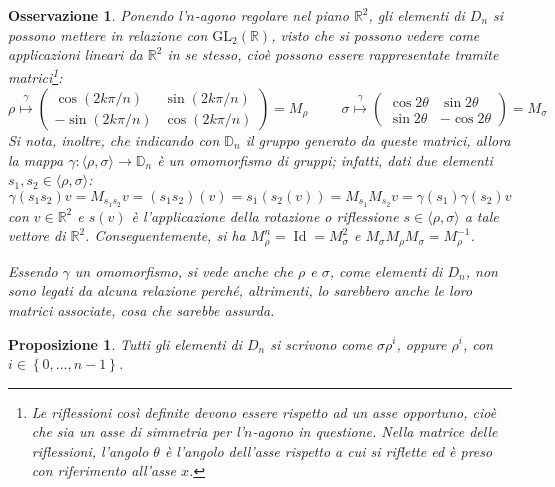 \documentclass[11pt]{article}
\theoremstyle{style}
\newtheorem{prop}{Proposizione}[section]
\newtheorem{osservazione}{Osservazione}[section]
\numberwithin{equation}{subsection}
\begin{document}
\begin{osservazione}
	Ponendo l'$n$-agono regolare nel piano $\mathbb{R}^2$, gli elementi di $D_n$ si possono mettere in relazione con $\mathrm{GL} _2(\mathbb{R})$, visto che si possono vedere come applicazioni lineari da $\mathbb{R}^2$ in se stesso, cio\`e possono essere rappresentate tramite matrici\footnote{Le riflessioni cos\`i definite devono essere rispetto ad un asse opportuno, cio\`e che sia un asse di simmetria per l'$n$-agono in questione. Nella matrice delle riflessioni, l'angolo $\theta $ \`e l'angolo dell'asse rispetto a cui si riflette ed \`e preso con riferimento all'asse $x$.}:
\begin{equation*}
	\rho  \stackrel{\gamma}{\longmapsto} \begin{pmatrix} \displaystyle \cos \left(2k\pi / n\right) & \sin \left(2k\pi / n\right) \\ - \sin \left( 2k\pi / n\right) & \cos (2k\pi / n) \end{pmatrix}=M_\rho  \hspace{1cm}\sigma \stackrel{\gamma}{\longmapsto} \begin{pmatrix} \cos 2 \theta  & \sin 2\theta  \\ \sin 2\theta  & - \cos 2\theta  \end{pmatrix} = M_\sigma 
\end{equation*}
Si nota, inoltre, che indicando con $\mathbb{D}_n$ il gruppo generato da queste matrici, allora la mappa $\gamma : \langle \rho ,\sigma  \rangle\to \mathbb{D}_n$ \`e un omomorfismo di gruppi; infatti, dati due elementi $s_1,s_2 \in \langle \rho ,\sigma  \rangle$:
\[
\gamma(s_1s_2)v= M_{s_1s_2} v = (s_1s_2) (v) = s_1 (s_2 (v)) =M_{s_1} M_{s_2} v = \gamma(s_1)\gamma(s_2)v
\] 
con $v \in \mathbb{R}^2$ e $s(v)$ \`e l'applicazione della rotazione o riflessione $s \in \langle \rho ,\sigma  \rangle$ a tale vettore di $\mathbb{R}^2$.
Conseguentemente, si ha $M_\rho ^n = \operatorname{Id}=M_\sigma ^2 $ e $M_\sigma M_\rho M_\sigma = M_\rho ^{-1}$.

Essendo $\gamma$ un omomorfismo, si vede anche che $\rho $ e $\sigma $, come elementi di $D_n$, non sono legati da alcuna relazione perch\'e, altrimenti, lo sarebbero anche le loro matrici associate, cosa che sarebbe assurda. 
\end{osservazione}
\begin{prop}\label{dnitems}
	Tutti gli elementi di $D_n$ si scrivono come $\sigma \rho ^i$, oppure $\rho ^i$, con $i \in \left\{ 0,\ldots,n-1 \right\} $.
\end{prop}
\end{document}
